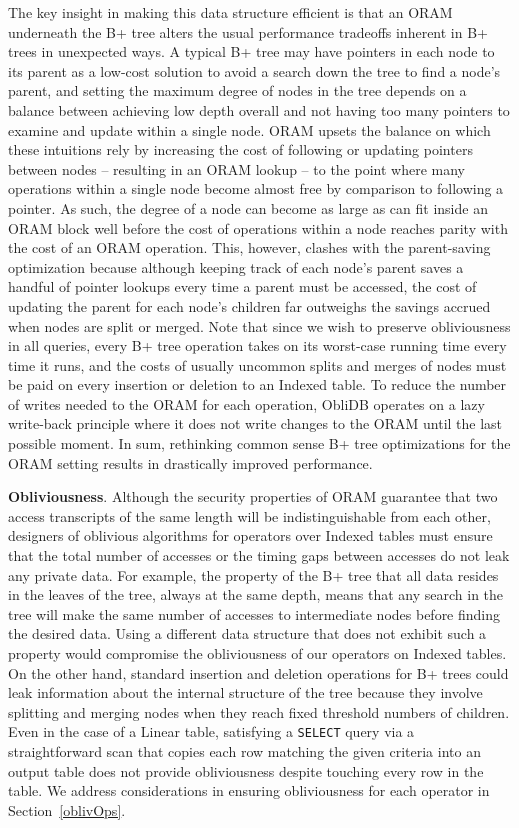 \documentclass[letterpaper,twocolumn,10pt]{article}
\def\name/{ObliDB}
\begin{document}
The key insight in making this data structure efficient is that an ORAM underneath the B+ tree alters the usual performance tradeoffs inherent in B+ trees in unexpected ways. A typical B+ tree may have pointers in each node to its parent as a low-cost solution to avoid a search down the tree to find a node's parent, and setting the maximum degree of nodes in the tree depends on a balance between achieving low depth overall and not having too many pointers to examine and update within a single node. ORAM upsets the balance on which these intuitions rely by increasing the cost of following or updating pointers between nodes -- resulting in an ORAM lookup -- to the point where many operations within a single node become almost free by comparison to following a pointer. As such, the degree of a node can become as large as can fit inside an ORAM block well before the cost of operations within a node reaches parity with the cost of an ORAM operation. This, however, clashes with the parent-saving optimization because although keeping track of each node's parent saves a handful of pointer lookups every time a parent must be accessed, the cost of updating the parent for each node's children far outweighs the savings accrued when nodes are split or merged. Note that since we wish to preserve obliviousness in all queries, every B+ tree operation takes on its worst-case running time every time it runs, and the costs of usually uncommon splits and merges of nodes must be paid on every insertion or deletion to an Indexed table. To reduce the number of writes needed to the ORAM for each operation, \name/ operates on a lazy write-back principle where it does not write changes to the ORAM until the last possible moment. In sum, rethinking common sense B+ tree optimizations for the ORAM setting results in drastically improved performance. 

 \noindent \textbf{Obliviousness}. Although the security properties of ORAM guarantee that two access transcripts of the same length will be indistinguishable from each other, designers of oblivious algorithms for operators over Indexed tables must ensure that the total number of accesses or the timing gaps between accesses do not leak any private data. For example, the property of the B+ tree that all data resides in the leaves of the tree, always at the same depth, means that any search in the tree will make the same number of accesses to intermediate nodes before finding the desired data. Using a different data structure that does not exhibit such a property would compromise the obliviousness of our operators on Indexed tables. On the other hand, standard insertion and deletion operations for B+ trees could leak information about the internal structure of the tree because they involve splitting and merging nodes when they reach fixed threshold numbers of children. Even in the case of a Linear table, satisfying a \texttt{SELECT} query via a straightforward scan that copies each row matching the given criteria into an output table does not provide obliviousness despite touching every row in the table. We address considerations in ensuring obliviousness for each operator in Section~\ref{oblivOps}.
\end{document}
